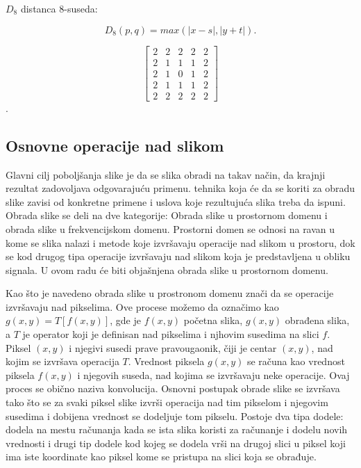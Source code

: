 \documentclass[a4paper,12pt,titlepage]{article}
\begin{document}
$D_{8}$ distanca 8-suseda:

\begin{equation}\label{eq:8ne}
D_{8}(p, q) = max(|x - s|, |y + t|).
\end{equation} 

\[
\begin{bmatrix}
     2 & 2 & 2 & 2  & 2 \\
     2 & 1 & 1 & 1  & 2 \\
     2 & 1 & 0 & 1 & 2 \\
     2 & 1 & 1 & 1  & 2 \\
     2 & 2 & 2 & 2  & 2 
\end{bmatrix}
\].

\subsection{Osnovne operacije nad slikom}%

Glavni cilj poboljšanja slike je da se slika obradi na takav način, da krajnji rezultat zadovoljava odgovarajuću primenu. tehnika koja će da se koriti za obradu slike zavisi od konkretne primene i uslova koje rezultujuća slika treba da ispuni. Obrada slike se deli na dve kategorije: Obrada slike u prostornom domenu i obrada slike u frekvencijskom domenu. Prostorni domen se odnosi na ravan u kome se slika nalazi i metode koje izvršavaju operacije nad slikom u prostoru, dok se kod drugog tipa operacije izvršavaju nad slikom koja je predstavljena u obliku signala. U ovom radu će biti objašnjena obrada slike u prostornom domenu.

Kao što je navedeno obrada slike u prostronom domenu znači da se operacije izvršavaju nad pikselima. Ove procese možemo da označimo kao $g(x, y) = T[f(x, y)]$, gde je $f(x, y)$ početna slika, $g(x, y)$ obrađena slika, a $T$ je operator koji je definisan nad pikselima i njhovim susedima na slici $f$. Piksel $(x, y)$ i njegivi susedi prave pravougaonik, čiji je centar $(x, y)$, nad kojim se izvršava operacija $T$. Vrednost piksela $g(x, y)$ se računa kao vrednost piksela $f(x, y)$ i njegovih suseda, nad kojima se izvršavaju neke operacije. Ovaj proces se obično naziva konvolucija. Osnovni postupak obrade slike se izvršava tako što se za svaki piksel slike izvrši operacija nad tim pikselom i njegovim susedima i dobijena vrednost se dodeljuje tom pikselu. Postoje dva tipa dodele: dodela na mestu računanja kada se ista slika koristi za računanje i dodelu novih vrednosti i drugi tip dodele kod kojeg se dodela vrši na drugoj slici u piksel koji ima iste koordinate kao piksel kome se pristupa na slici koja se obrađuje. 
\end{document}
